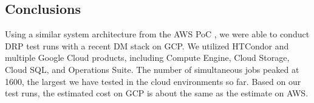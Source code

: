 \subsection{Conclusions}
Using a similar system architecture from the AWS PoC , we were able to conduct DRP test runs with a recent DM stack on GCP.
We utilized HTCondor and multiple Google Cloud products, including Compute Engine, Cloud Storage, Cloud SQL, and Operations Suite.
The number of simultaneous jobs peaked at 1600, the largest we have tested in the cloud environments so far.
Based on our test runs, the estimated cost on GCP is about the same as the estimate on AWS.
